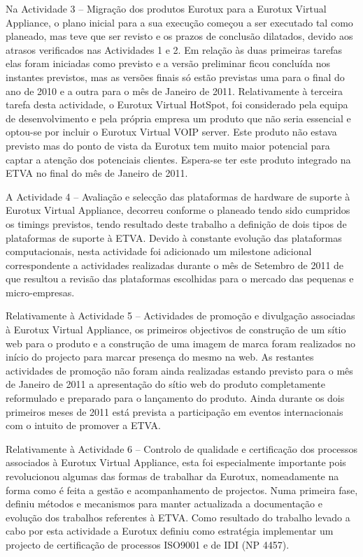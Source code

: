 \documentclass[a4paper,12pt,portugues]{article}
\begin{document}
Na Actividade 3 – Migração dos produtos Eurotux para a Eurotux Virtual
Appliance, o plano inicial para a sua execução começou a ser executado tal
como planeado, mas teve que ser revisto e os prazos de conclusão dilatados,
devido aos atrasos verificados nas Actividades 1 e 2. Em relação às duas
primeiras tarefas elas foram iniciadas como previsto e a versão preliminar
ficou concluída nos instantes previstos, mas as versões finais só estão
previstas uma para o final do ano de 2010 e a outra para o mês de Janeiro de
2011. Relativamente à terceira tarefa desta actividade, o Eurotux Virtual
HotSpot, foi considerado pela equipa de desenvolvimento e pela própria empresa
um produto que não seria essencial e optou-se por incluir o Eurotux Virtual
VOIP server. Este produto não estava previsto mas do ponto de vista da Eurotux
tem muito maior potencial para captar a atenção dos potenciais clientes.
Espera-se ter este produto integrado na ETVA no final do mês de Janeiro de
2011.

A Actividade 4 – Avaliação e selecção das plataformas de hardware de suporte à
Eurotux Virtual Appliance, decorreu conforme o planeado tendo sido cumpridos
os timings previstos, tendo resultado deste trabalho a definição de dois tipos
de plataformas de suporte à ETVA. Devido à constante evolução das plataformas
computacionais, nesta actividade foi adicionado um milestone adicional
correspondente a actividades realizadas durante o mês de Setembro de 2011 de
que resultou a revisão das plataformas escolhidas para o mercado das pequenas
e micro-empresas.

Relativamente à Actividade 5 – Actividades de promoção e divulgação associadas
à Eurotux Virtual Appliance, os primeiros objectivos de construção de um sítio
web para o produto e a construção de uma imagem de marca foram realizados no
início do projecto para marcar presença do mesmo na web. As restantes
actividades de promoção não foram ainda realizadas estando previsto para o mês
de Janeiro de 2011 a apresentação do sítio web do produto completamente
reformulado e preparado para o lançamento do produto. Ainda durante os dois
primeiros meses de 2011 está prevista a participação em eventos internacionais
com o intuito de promover a ETVA.

Relativamente à Actividade 6 – Controlo de qualidade e certificação dos
processos associados à Eurotux Virtual Appliance, esta foi especialmente
importante pois revolucionou algumas das formas de trabalhar da Eurotux,
nomeadamente na forma como é feita a gestão e acompanhamento de projectos.
Numa primeira fase, definiu métodos e mecanismos para manter actualizada a
documentação e evolução dos trabalhos referentes à ETVA. Como resultado do
trabalho levado a cabo por esta actividade a Eurotux definiu como estratégia
implementar um projecto de certificação de processos ISO9001 e de IDI (NP
4457).
\end{document}
